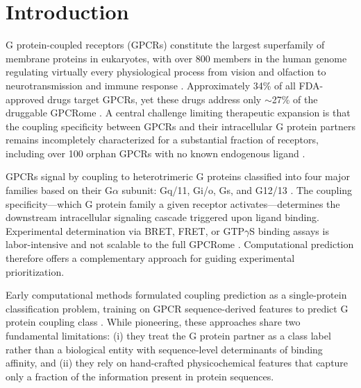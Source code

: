 \documentclass[11pt,a4paper]{article}
\begin{document}
\section{Introduction}

G protein-coupled receptors (GPCRs) constitute the largest superfamily of membrane proteins in eukaryotes, with over 800 members in the human genome regulating virtually every physiological process from vision and olfaction to neurotransmission and immune response \cite{pierce2002seven, rosenbaum2009structure}. Approximately 34\% of all FDA-approved drugs target GPCRs, yet these drugs address only $\sim$27\% of the druggable GPCRome \cite{hauser2017trends, sriram2019gprotein}. A central challenge limiting therapeutic expansion is that the coupling specificity between GPCRs and their intracellular G protein partners remains incompletely characterized for a substantial fraction of receptors, including over 100 orphan GPCRs with no known endogenous ligand \cite{tang2023orphan,foster2019discovery}.

GPCRs signal by coupling to heterotrimeric G proteins classified into four major families based on their G$\alpha$ subunit: Gq/11, Gi/o, Gs, and G12/13 \cite{wettschureck2005mammalian}. The coupling specificity---which G protein family a given receptor activates---determines the downstream intracellular signaling cascade triggered upon ligand binding. Experimental determination via BRET, FRET, or GTP$\gamma$S binding assays is labor-intensive and not scalable to the full GPCRome \cite{olsen2020gprotein}. Computational prediction therefore offers a complementary approach for guiding experimental prioritization.

Early computational methods formulated coupling prediction as a single-protein classification problem, training on GPCR sequence-derived features to predict G protein coupling class \cite{roller2001prediction, ono2006prediction, sgourakis2005method, yabuki2005gprotein}. While pioneering, these approaches share two fundamental limitations: (i) they treat the G protein partner as a class label rather than a biological entity with sequence-level determinants of binding affinity, and (ii) they rely on hand-crafted physicochemical features that capture only a fraction of the information present in protein sequences.
\end{document}
